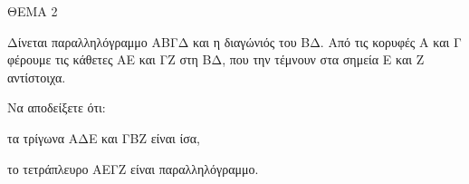
ΘΕΜΑ 2

Δίνεται παραλληλόγραμμο ΑΒΓΔ και η διαγώνιός του ΒΔ. Από τις κορυφές Α και Γ φέρουμε τις κάθετες ΑΕ και ΓΖ στη ΒΔ, που την τέμνουν στα σημεία Ε και Ζ αντίστοιχα.

Να αποδείξετε ότι:

\begin{alist}
\item τα τρίγωνα ΑΔΕ και ΓΒΖ είναι ίσα, 

\item το τετράπλευρο ΑΕΓΖ είναι παραλληλόγραμμο. 
\end{alist}
